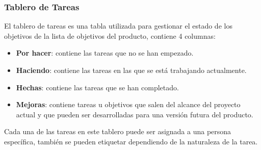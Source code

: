 \subsubsection{Tablero de Tareas}
El tablero de tareas es una tabla utilizada para gestionar el estado de los objetivos de la lista de objetivos del producto, contiene 4 columnas:

\begin{itemize}
    \item \textbf{Por hacer}: contiene las tareas que no se han empezado.
    \item \textbf{Haciendo}: contiene las tareas en las que se está trabajando actualmente.
    \item \textbf{Hechas}: contiene las tareas que se han completado.
    \item \textbf{Mejoras}: contiene tareas u objetivos que salen del alcance del proyecto actual y que pueden ser desarrolladas para una versión futura del producto.
\end{itemize}

Cada una de las tareas en este tablero puede ser asignada a una persona específica, también se pueden etiquetar dependiendo de la naturaleza de la tarea.